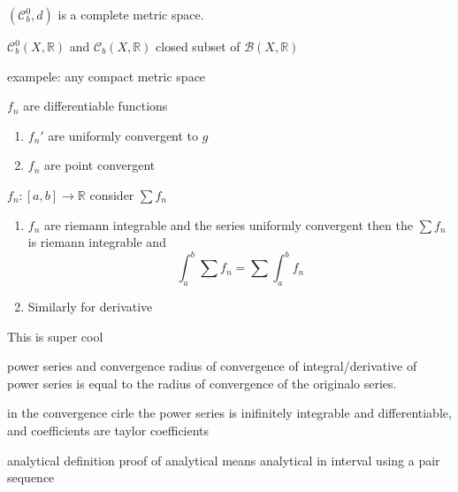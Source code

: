 \begin{proposition}
    \((\mathcal{C}^0_b,d)\) is a complete metric space.
\end{proposition}
\begin{definition}
    \(\mathcal{C}^0_b(X,\mathbb{R})\) and 	\(\mathcal{C}_b(X,\mathbb{R})\) closed subset of \(\mathcal{B}(X,\mathbb{R})\)
\end{definition}
exampele: any compact metric space
\begin{theorem}
    \(f_n\) are differentiable functions
    \begin{enumerate}
        \item \(f_n'\) are uniformly convergent to \(g\)
        \item \(f_n\) are point convergent
    \end{enumerate}
\end{theorem}
\begin{proposition}
    \(f_n:[a,b] \to \mathbb{R}\) consider \(\sum{f_n}\)
    \begin{enumerate}
        \item \(f_n\) are riemann integrable and the series uniformly convergent then the \(\sum{f_n}\) is riemann integrable and
              \[ \int_{a}^{b}{\sum{f_n}} = \sum {\int_{a}^{b}{f_n}}\]
        \item
              Similarly for derivative
    \end{enumerate}
\end{proposition}
\begin{definition}
    This is super cool
\end{definition}
power series and convergence
radius of convergence of integral/derivative of power series is equal to the radius of convergence of the originalo series.
\begin{theorem}
    in the convergence cirle the power series is inifinitely integrable and differentiable, and coefficients are taylor coefficients
\end{theorem}
analytical definition
proof of analytical means analytical in interval using a pair sequence
